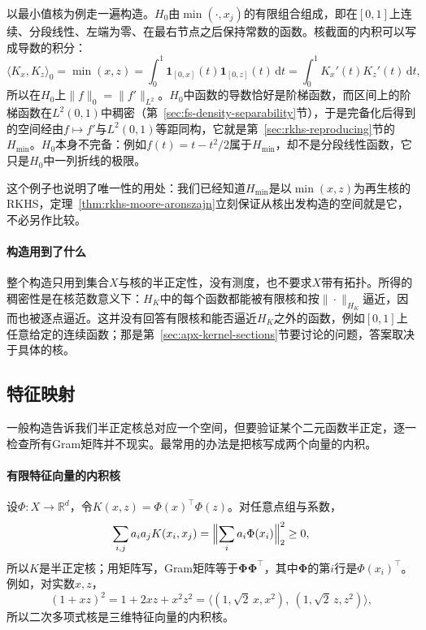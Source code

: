 以最小值核为例走一遍构造。$H_0$由$\min(\cdot,x_j)$的有限组合组成，即在$[0,1]$上连续、分段线性、左端为零、在最右节点之后保持常数的函数。核截面的内积可以写成导数的积分：
\[
\langle K_x,K_z\rangle_0=\min(x,z)=\int_0^1\mathbf 1_{[0,x]}(t)\mathbf 1_{[0,z]}(t)\,\mathrm dt=\int_0^1K_x'(t)K_z'(t)\,\mathrm dt ,
\]
所以在$H_0$上$\|f\|_0=\|f'\|_{L^2}$。$H_0$中函数的导数恰好是阶梯函数，而区间上的阶梯函数在$L^2(0,1)$中稠密（第~\ref{sec:fs-density-separability}节），于是完备化后得到的空间经由$f\mapsto f'$与$L^2(0,1)$等距同构，它就是第~\ref{sec:rkhs-reproducing}节的$H_{\min}$。$H_0$本身不完备：例如$f(t)=t-t^2/2$属于$H_{\min}$，却不是分段线性函数，它只是$H_0$中一列折线的极限。

这个例子也说明了唯一性的用处：我们已经知道$H_{\min}$是以$\min(x,z)$为再生核的RKHS，定理~\ref{thm:rkhs-moore-aronszajn}立刻保证从核出发构造的空间就是它，不必另作比较。

\paragraph{构造用到了什么}

整个构造只用到集合$X$与核的半正定性，没有测度，也不要求$X$带有拓扑。所得的稠密性是在核范数意义下：$H_K$中的每个函数都能被有限核和按$\|\cdot\|_{H_K}$逼近，因而也被逐点逼近。这并没有回答有限核和能否逼近$H_K$之外的函数，例如$[0,1]$上任意给定的连续函数；那是第~\ref{sec:apx-kernel-sections}节要讨论的问题，答案取决于具体的核。

\subsection{特征映射}
\label{sec:rkhs-feature-maps}

一般构造告诉我们半正定核总对应一个空间，但要验证某个二元函数半正定，逐一检查所有Gram矩阵并不现实。最常用的办法是把核写成两个向量的内积。

\paragraph{有限特征向量的内积核}

设$\Phi:X\to\mathbb R^d$，令$K(x,z)=\Phi(x)^{\top}\Phi(z)$。对任意点组与系数，
\[
\sum_{i,j}a_ia_jK(x_i,x_j)=\Bigl\|\sum_ia_i\Phi(x_i)\Bigr\|_2^2\ge0 ,
\]
所以$K$是半正定核；用矩阵写，Gram矩阵等于$\bm\Phi\bm\Phi^{\top}$，其中$\bm\Phi$的第$i$行是$\Phi(x_i)^{\top}$。例如，对实数$x,z$，
\[
(1+xz)^2=1+2xz+x^2z^2=\bigl\langle(1,\sqrt2\,x,x^2),\ (1,\sqrt2\,z,z^2)\bigr\rangle ,
\]
所以二次多项式核是三维特征向量的内积核。

